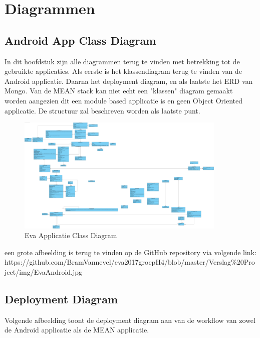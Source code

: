 \chapter{Diagrammen}
\label{ch:Diagrammen}

\section{Android App Class Diagram}

In dit hoofdstuk zijn alle diagrammen terug te vinden met betrekking tot de gebruikte applicaties. Als eerste is het klassendiagram terug te vinden van de Android applicatie. Daarna het deployment diagram, en als laatste het ERD van Mongo. Van de MEAN stack kan niet echt een "klassen" diagram gemaakt worden aangezien dit een module based applicatie is en geen Object Oriented applicatie. De structuur zal beschreven worden als laatste punt.

\begin{figure}[H]
	\centering
	\includegraphics[width=10cm]{img/EvaAndroid.jpg}
	\caption{Eva Applicatie Class Diagram}
\end{figure}

een grote afbeelding is terug te vinden op de GitHub repository via volgende link: https://github.com/BramVannevel/eva2017groepH4/blob/master/Verslag\%20Project/img/EvaAndroid.jpg

\section{Deployment Diagram}

Volgende afbeelding toont de deployment diagram aan van de workflow van zowel de Android applicatie als de MEAN applicatie.


